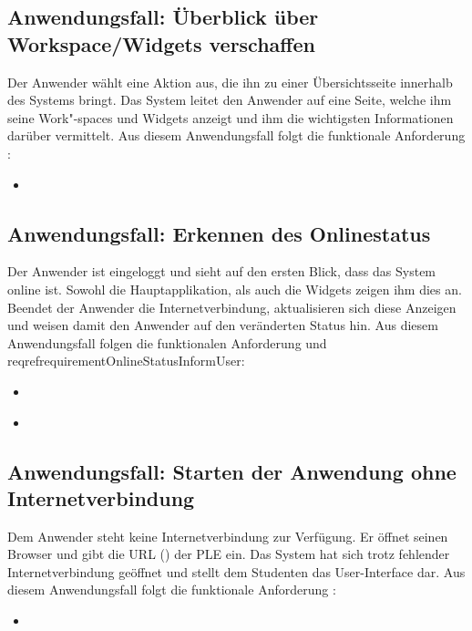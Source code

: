 \subsection{Anwendungsfall: Überblick über Workspace/Widgets verschaffen}
Der Anwender wählt eine Aktion aus, die ihn zu einer Übersichtsseite innerhalb des Systems bringt. Das System leitet den Anwender auf eine Seite, welche ihm seine Work"-spaces und Widgets anzeigt und ihm die wichtigsten Informationen darüber vermittelt. Aus diesem Anwendungsfall folgt die funktionale Anforderung :
\begin{itemize}
 \item \requirementf{\requirementDashboard}\label{requirementDashboard}
\end{itemize}

\subsection{Anwendungsfall: Erkennen des Onlinestatus}
Der Anwender ist eingeloggt und sieht auf den ersten Blick, dass das System online ist. Sowohl die Hauptapplikation, als auch die Widgets zeigen ihm dies an. Beendet der Anwender die Internetverbindung, aktualisieren sich diese Anzeigen und weisen damit den Anwender auf den veränderten Status hin. Aus diesem Anwendungsfall folgen die funktionalen Anforderung  und reqref{requirementOnlineStatusInformUser}:
\begin{itemize}
 \item \requirementf{\requirementCheckOnlineStatus}\label{requirementCheckOnlineStatus}
 \item \requirementf{\requirementOnlineStatusInformUser}\label{requirementOnlineStatusInformUser}
\end{itemize}

\subsection{Anwendungsfall: Starten der Anwendung ohne Internetverbindung}
Dem Anwender steht keine Internetverbindung zur Verfügung. Er öffnet seinen Browser und gibt die \acs{URL} () der \ac{PLE} ein. Das System hat sich trotz fehlender Internetverbindung geöffnet und stellt dem Studenten das User-Interface dar. Aus diesem Anwendungsfall folgt die funktionale Anforderung :
\begin{itemize}
 \item \requirementf{\requirementOfflineStart}\label{requirementOfflineStart}
\end{itemize}

